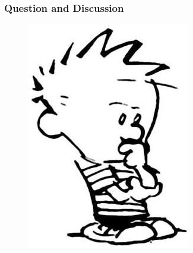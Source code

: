 \documentclass[c]{beamer}
\begin{document}
\begin{frame}[b]
 	\frametitle{Question and Discussion}
 	\vspace{3mm}
    \begin{figure}
    \centering
    \includegraphics[scale=.43]{Slides/Fig/Q1.jpg}
    \end{figure}
  \vskip30pt
\end{frame}
\end{document}
